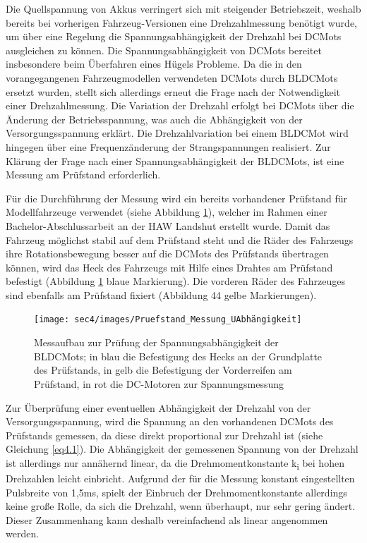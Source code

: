 Die Quellspannung von Akkus verringert sich mit steigender Betriebszeit, weshalb bereits bei vorherigen Fahrzeug-Versionen eine Drehzahlmessung benötigt wurde, um über eine Regelung die Spannungsabhängigkeit der Drehzahl bei \acp{DCMot} ausgleichen zu können. Die Spannungsabhängigkeit von \acp{DCMot} bereitet insbesondere beim Überfahren eines Hügels Probleme. Da die in den vorangegangenen Fahrzeugmodellen verwendeten \acp{DCMot} durch \acp{BLDCMot} ersetzt wurden, stellt sich allerdings erneut die Frage nach der Notwendigkeit einer Drehzahlmessung. Die Variation der Drehzahl erfolgt bei \acp{DCMot} über die Änderung der Betriebsspannung, was auch die Abhängigkeit von der Versorgungsspannung erklärt. Die Drehzahlvariation bei einem \ac{BLDCMot} wird hingegen über eine Frequenzänderung der Strangspannungen realisiert. Zur Klärung der Frage nach einer Spannungsabhängigkeit der \acp{BLDCMot}, ist eine Messung am Prüfstand erforderlich.\vspace{11pt}

Für die Durchführung der Messung wird ein bereits vorhandener Prüfstand für Modellfahrzeuge verwendet (siehe Abbildung \ref{fig:Pruefstand01}), welcher im Rahmen einer Bachelor-Abschlussarbeit an der HAW Landshut erstellt wurde. Damit das Fahrzeug möglichst stabil auf dem Prüfstand steht und die Räder des Fahrzeugs ihre Rotationsbewegung besser auf die \acp{DCMot} des Prüfstands übertragen können, wird das Heck des Fahrzeugs mit Hilfe eines Drahtes am Prüfstand befestigt (Abbildung \ref{fig:Pruefstand01} blaue Markierung). Die vorderen Räder des Fahrzeuges sind ebenfalls am Prüfstand fixiert (Abbildung 44 gelbe Markierungen). 

\begin{figure}[H] %
\texttt{[image: sec4/images/Pruefstand\_Messung\_UAbhängigkeit]} 
\centering
\captionsetup{width=.95\textwidth}
\caption[Messaufbau zur Prüfung der Spannungsabhängigkeit der \acp{BLDCMot}]{Messaufbau zur Prüfung der Spannungsabhängigkeit der \acp{BLDCMot}; in blau die Befestigung des Hecks an der Grundplatte des Prüfstands, in gelb die Befestigung der Vorderreifen am Prüfstand, in rot die DC-Motoren zur Spannungsmessung}\centering
\label{fig:Pruefstand01}
\end{figure}

Zur Überprüfung einer eventuellen Abhängigkeit der Drehzahl von der Versorgungsspannung, wird die Spannung an den vorhandenen \acp{DCMot} des Prüfstands gemessen, da diese direkt proportional zur Drehzahl ist (siehe Gleichung \ref{eq4.1}). Die Abhängigkeit der gemessenen Spannung von der Drehzahl ist allerdings nur annähernd linear, da die Drehmomentkonstante k\textsubscript{i} bei hohen Drehzahlen leicht einbricht. Aufgrund der für die Messung konstant eingestellten Pulsbreite von 1,5ms, spielt der Einbruch der Drehmomentkonstante allerdings keine große Rolle, da sich die Drehzahl, wenn überhaupt, nur sehr gering ändert. Dieser Zusammenhang kann deshalb vereinfachend als linear angenommen werden.\vspace{11pt}

